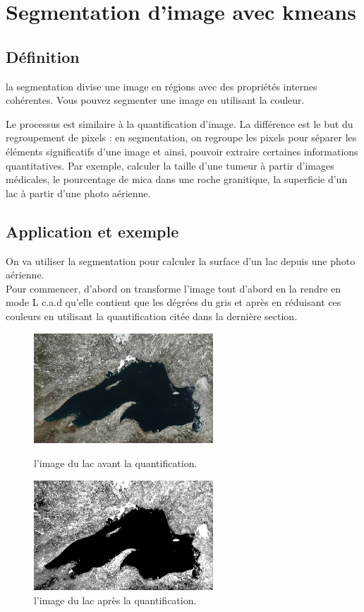 \documentclass[a4paper,12pt]{report}
\begin{document}
\section{Segmentation d'image avec kmeans }
\subsection*{Définition }
la segmentation divise une image en régions avec des propriétés internes cohérentes. Vous pouvez segmenter une image en utilisant la couleur.

Le processus est similaire à la quantification d'image. La différence est le but du regroupement de pixels : en segmentation, on regroupe les pixels pour séparer les éléments significatifs d'une image et ainsi, pouvoir extraire certaines informations quantitatives. Par exemple, calculer la taille d'une tumeur à partir d'images médicales, le pourcentage de mica dans une roche granitique, la superficie d'un lac à partir d'une photo aérienne.

\subsection*{Application et exemple }
On va utiliser la segmentation pour calculer la surface d'un lac depuis une photo aérienne.\\Pour commencer, d'abord on transforme l'image tout d'abord en la rendre en mode L c.a.d qu'elle contient que les dégrées du gris et après en réduisant ces couleurs en utilisant la quantification citée dans la dernière section.

\begin{figure}[ht]
    \centering
    \includegraphics[width=0.6\textwidth]{lac.PNG}
    \caption{l'image du lac avant la quantification.}
    \includegraphics[width=0.6\textwidth]{lac after segmentation.PNG}
    \caption{l'image du lac après la quantification.}
\end{figure}
\end{document}
